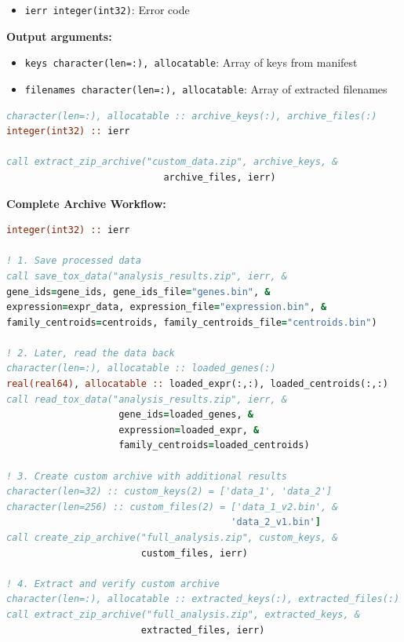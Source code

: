 \begin{enumerate}
\begin{itemize}
\begin{itemize}
                    \item \texttt{ierr integer(int32)}: Error code
                  \end{itemize}
                  \textbf{Output arguments:}
                  \begin{itemize}
                    \item \texttt{keys character(len=:), allocatable}: Array of keys from
                          manifest
                          
                    \item \texttt{filenames character(len=:), allocatable}: Array of extracted
                          filenames
                  \end{itemize}
                  \begin{lstlisting}[language=Fortran, caption={Extract Custom Archive}]
character(len=:), allocatable :: archive_keys(:), archive_files(:)
integer(int32) :: ierr

call extract_zip_archive("custom_data.zip", archive_keys, &
                            archive_files, ierr)
                  \end{lstlisting}
                  
                  \textbf{Complete Archive Workflow:} 
                  \begin{lstlisting}[language=Fortran, caption={Complete Archive Management Workflow}]
integer(int32) :: ierr

! 1. Save processed data
call save_tox_data("analysis_results.zip", ierr, &
gene_ids=gene_ids, gene_ids_file="genes.bin", &
expression=expr_data, expression_file="expression.bin", &
family_centroids=centroids, family_centroids_file="centroids.bin")

! 2. Later, read the data back
character(len=:), allocatable :: loaded_genes(:)
real(real64), allocatable :: loaded_expr(:,:), loaded_centroids(:,:)
call read_tox_data("analysis_results.zip", ierr, &
                    gene_ids=loaded_genes, &
                    expression=loaded_expr, &
                    family_centroids=loaded_centroids)

! 3. Create custom archive with additional results
character(len=32) :: custom_keys(2) = ['data_1', 'data_2']
character(len=256) :: custom_files(2) = ['data_1_v2.bin', &
                                        'data_2_v1.bin']
call create_zip_archive("full_analysis.zip", custom_keys, &
                        custom_files, ierr)

! 4. Extract and verify custom archive
character(len=:), allocatable :: extracted_keys(:), extracted_files(:)
call extract_zip_archive("full_analysis.zip", extracted_keys, &
                        extracted_files, ierr)
            \end{lstlisting}
            

\end{itemize}
\end{enumerate}
